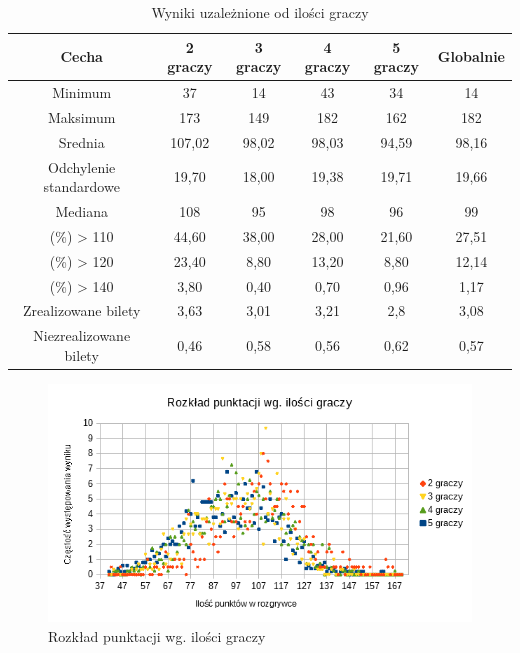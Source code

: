 \documentclass[12pt, oneside]{report}
\begin{document}
\begin{table}[h]
	\begin{center}
		\begin{tabular}{| c | c | c | c | c | c |} \hline
			Cecha & 2 graczy & 3 graczy & 4 graczy & 5 graczy & Globalnie \\ \hline
			Minimum & 37 & 14 & 43 & 34 & 14 \\ \hline
			Maksimum & 173 & 149 & 182 & 162 & 182 \\ \hline
			Srednia & 107,02 & 98,02 & 98,03 & 94,59 & 98,16 \\ \hline
			Odchylenie standardowe & 19,70 & 18,00 & 19,38 & 19,71 & 19,66 \\ \hline
			Mediana & 108 & 95 & 98 & 96 & 99 \\ \hline
			(\%) > 110 & 44,60 & 38,00 & 28,00 & 21,60 & 27,51 \\ \hline
			(\%) > 120 & 23,40 & 8,80 & 13,20 & 8,80 & 12,14 \\ \hline
			(\%) > 140 & 3,80 & 0,40 & 0,70 & 0,96 & 1,17 \\ \hline
			Zrealizowane bilety & 3,63 & 3,01 & 3,21 & 2,8 & 3,08 \\ \hline
			Niezrealizowane bilety & 0,46 & 0,58 & 0,56 & 0,62 & 0,57 \\ \hline
		\end{tabular}
		\caption{Wyniki uzależnione od ilości graczy}
		\label{table:algo_sizeresult}
	\end{center}
\end{table}

\begin{figure}
	\includegraphics[height=0.45\textheight,width=\textwidth]{Wykrespunktow.png}
	\caption{Rozkład punktacji wg. ilości graczy}
	\label{figure:player_points_algo}
\end{figure}
\end{document}
